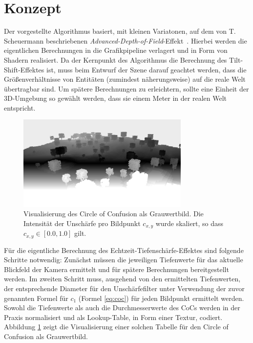 \documentclass{acmsiggraph}                     %
\begin{document}
\section{Konzept}

Der vorgestellte Algorithmus basiert, mit kleinen Variatonen, auf dem von T. Scheuermann beschriebenen \emph{Advanced-Depth-of-Field}-Effekt~\cite{Scheuermann:2004wd}. Hierbei werden die eigentlichen Berechnungen in die Grafikpipeline verlagert und in Form von Shadern realisiert. Da der Kernpunkt des Algorithmus die Berechnung des Tilt-Shift-Effektes ist, muss beim Entwurf der Szene darauf geachtet werden, dass die Größenverhältnisse von Entitäten (zumindest näherungsweise) auf die reale Welt übertragbar sind. Um spätere Berechnungen zu erleichtern, sollte eine Einheit der 3D-Umgebung so gewählt werden, dass sie einem Meter in der realen Welt entspricht.

\begin{figure}[htbp]
\centering
\includegraphics[width=3.35in]{Blockcraft-1-CoC}
\caption{Visualisierung des Circle of Confusion als Grauwertbild. Die Intensität der Unschärfe pro Bildpunkt $c_{x,y}$ wurde skaliert, so dass $c_{x,y} \in [0.0,1.0]$ gilt.}
\label{fig:cocmap}
\end{figure}

Für die eigentliche Berechnung des Echtzeit-Tiefenschärfe-Effektes sind folgende Schritte notwendig: Zunächst müssen die jeweiligen Tiefenwerte für das aktuelle Blickfeld der Kamera ermittelt und für spätere Berechnungen bereitgestellt werden. Im zweiten Schritt muss, ausgehend von den ermittelten Tiefenwerten, der entsprechende Diameter für den Unschärfefilter unter Verwendung der zuvor genannten Formel für $c_1$ (Formel \ref{eq:coc}) für jeden Bildpunkt ermittelt werden. Sowohl die Tiefenwerte als auch die Durchmesserwerte des CoCs werden in der Praxis normalisiert und als Lookup-Table, in Form einer Textur, codiert. Abbildung \ref{fig:cocmap} zeigt die Visualisierung einer solchen Tabelle für den Circle of Confusion als Grauwertbild. 
\end{document}
